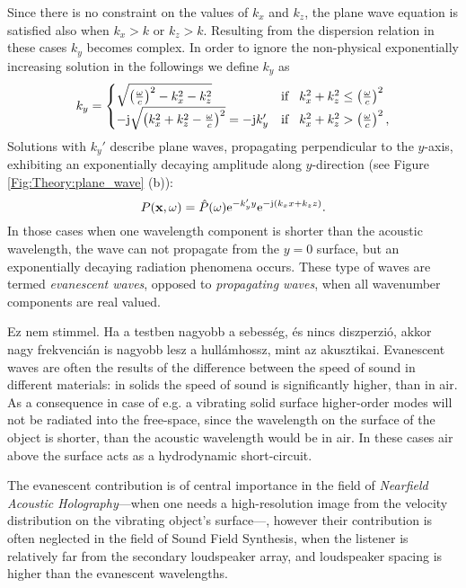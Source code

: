 Since there is no constraint on the values of $k_x$ and $k_z$, the plane wave equation is satisfied also when $k_x>k$ or $k_z>k$. Resulting from the dispersion relation in these cases $k_y$ becomes complex.
In order to ignore the non-physical exponentially increasing solution in the followings we define $k_y$ as 
\begin{equation}
k_y = \begin{cases}
                       \sqrt{\left(\frac{\omega}{c}\right)^2 - k_x^2 - k_z^2}  & \text{if} \hspace{3mm} k_x^2 + k_z^2 \leq \left(\frac{\omega}{c}\right)^2\\
                      -\mathrm{j} \sqrt{\left(k_x^2+k_z^2 - \frac{\omega}{c}\right)^2 } = -\mathrm{j} k_y' &  \text{if} \hspace{3mm} k_x^2 + k_z^2 > \left(\frac{\omega}{c}\right)^2,
                 \end{cases}
\label{eq:theory:k_y_definition}
\end{equation}
Solutions with $k_y'$ describe plane waves, propagating perpendicular to the $y$-axis, exhibiting an exponentially decaying amplitude along $y$-direction (see Figure \ref{Fig:Theory:plane_wave} (b)):
 \begin{equation}
 P(\mathbf{x},\omega) = \hat{P}(\omega) \mathrm{e}^{-k_y' y} \mathrm{e}^{-\mathrm{j} \left( k_x x + k_z z \right) }.
 \end{equation}
In those cases when one wavelength component is shorter than the acoustic wavelength, the wave can not propagate from the $y = 0$ surface, but an exponentially decaying radiation phenomena occurs. These type of waves are termed \emph{evanescent waves}, opposed to \emph{propagating waves}, when all wavenumber components are real valued.
 
{\color{red}Ez nem stimmel. Ha a testben nagyobb a sebesség, és nincs diszperzió, akkor nagy frekvencián is nagyobb lesz a hullámhossz, mint az akusztikai.
Evanescent waves are often the results of the difference between the speed of sound in different materials: in solids the speed of sound is significantly higher, than in air. As a consequence in case of e.g. a vibrating solid surface higher-order modes will not be radiated into the free-space, since the wavelength on the surface of the object is shorter, than the acoustic wavelength would be in air. In these cases air above the surface acts as a hydrodynamic short-circuit.}
 
The evanescent contribution is of central importance in the field of \emph{Nearfield Acoustic Holography}---when one needs a high-resolution image from the velocity distribution on the vibrating object's surface---, however their contribution is often neglected in the field of Sound Field Synthesis, when the listener is relatively far from the secondary loudspeaker array, and loudspeaker spacing is higher than the evanescent wavelengths.
 

